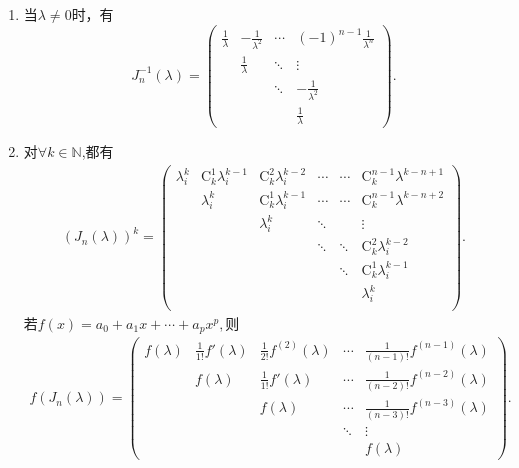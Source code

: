 \documentclass[../../main.tex]{subfiles}%
\begin{document}
\begin{proposition}[Jordan块的性质]
\begin{enumerate}[(1)]
\item 当$\lambda\neq 0$时，有
\[
J_n^{-1}(\lambda)=
\begin{pmatrix}
\frac{1}{\lambda} & -\frac{1}{\lambda^2} & \cdots & (-1)^{n - 1}\frac{1}{\lambda^n} \\
 & \frac{1}{\lambda} & \ddots & \vdots \\
 &  & \ddots & -\frac{1}{\lambda^2} \\
 &  &  & \frac{1}{\lambda}
\end{pmatrix}.
\]

\item 对$\forall k\in \mathbb{N}$,都有
\begin{align*}
\left( J_n\left( \lambda \right) \right) ^k=\left( \begin{matrix}
\lambda _{i}^{k}&		\mathrm{C}_{k}^{1}\lambda _{i}^{k-1}&		\mathrm{C}_{k}^{2}\lambda _{i}^{k-2}&		\cdots&		\cdots&		\mathrm{C}_{k}^{n-1}\lambda ^{k-n+1}\\
&		\lambda _{i}^{k}&		\mathrm{C}_{k}^{1}\lambda _{i}^{k-1}&		\cdots&		\cdots&		\mathrm{C}_{k}^{n-1}\lambda ^{k-n+2}\\
&		&		\lambda _{i}^{k}&		\ddots&		&		\vdots\\
&		&		&		\ddots&		\ddots&		\mathrm{C}_{k}^{2}\lambda _{i}^{k-2}\\
&		&		&		&		\ddots&		\mathrm{C}_{k}^{1}\lambda _{i}^{k-1}\\
&		&		&		&		&		\lambda _{i}^{k}\\
\end{matrix} \right) .
\end{align*}
若$f(x)=a_0+a_1x+\cdots+a_px^p,$则
\begin{align*}
f(J_n(\lambda))= \begin{pmatrix}
f(\lambda ) & \frac{1}{1!}f'(\lambda ) & \frac{1}{2!}f^{(2)}(\lambda ) & \cdots & \frac{1}{(n - 1)!}f^{(n - 1)}(\lambda ) \\
& f(\lambda ) & \frac{1}{1!}f'(\lambda ) & \cdots & \frac{1}{(n - 2)!}f^{(n - 2)}(\lambda ) \\
& & f(\lambda ) & \cdots & \frac{1}{(n - 3)!}f^{(n - 3)}(\lambda ) \\
& & & \ddots & \vdots \\
& & & & f(\lambda )
\end{pmatrix}. 
\end{align*}


\end{enumerate}
\end{proposition}
\end{document}
